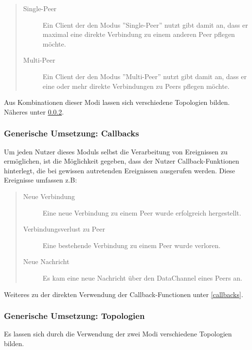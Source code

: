 \begin{quote}
  \begin{description}
  \item[Single-Peer]
  Ein Client der den Modus ''Single-Peer'' nutzt gibt damit an, dass er maximal eine direkte Verbindung zu einem anderen Peer pflegen möchte.

  \item[Multi-Peer]
  Ein Client der den Modus ''Multi-Peer'' nutzt gibt damit an, dass er eine oder mehr direkte Verbindungen zu Peers pflegen möchte.
  \end{description}
\end{quote}

Aus Kombinationen dieser Modi lassen sich verschiedene Topologien bilden. Näheres unter \ref{generictopology}.



\subsubsection{Generische Umsetzung: Callbacks}
Um jeden Nutzer dieses Moduls selbst die Verarbeitung von Ereignissen zu ermöglichen, ist die Möglichkeit gegeben, dass der Nutzer Callback-Funktionen hinterlegt, die bei gewissen autretenden Ereignissen ausgerufen werden.
Diese Ereignisse umfassen z.B:

\begin{quote}
  \begin{description}
  \item[Neue Verbindung]
  Eine neue Verbindung zu einem Peer wurde erfolgreich hergestellt.

  \item[Verbindungsverlust zu Peer]
  Eine bestehende Verbindung zu einem Peer wurde verloren.

  \item[Neue Nachricht]
  Es kam eine neue Nachricht über den DataChannel eines Peers an.
  \end{description}
\end{quote}

Weiteres zu der direkten Verwendung der Callback-Functionen unter \ref{callbacks}.



\subsubsection{Generische Umsetzung: Topologien} \label{generictopology}
Es lassen sich durch die Verwendung der zwei Modi verschiedene Topologien bilden.


